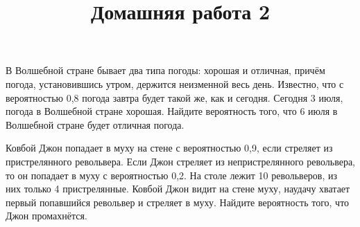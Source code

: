\begin{listofex}
	\item В Волшебной стране бывает два типа погоды: хорошая и отличная, причём погода, установившись утром, держится неизменной весь день. Известно, что с вероятностью 0,8 погода завтра будет такой же, как и сегодня. Сегодня 3 июля, погода в Волшебной стране хорошая. Найдите вероятность того, что 6 июля в Волшебной стране будет отличная погода.
	\item Ковбой Джон попадает в муху на стене с вероятностью 0,9, если стреляет из пристрелянного револьвера. Если Джон стреляет из непристрелянного револьвера, то он попадает в муху с вероятностью 0,2. На столе лежит 10 револьверов, из них только 4 пристрелянные. Ковбой Джон видит на стене муху, наудачу хватает первый попавшийся револьвер и стреляет в муху. Найдите вероятность того, что Джон промахнётся.
\end{listofex}
%	
\newpage
{}
\title{Домашняя работа 2}
